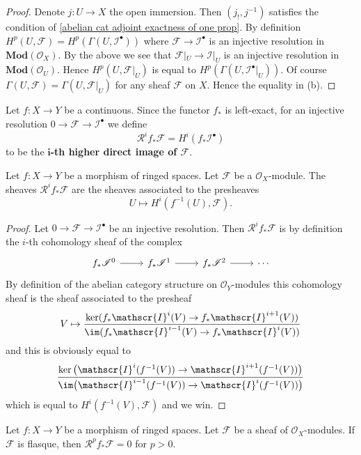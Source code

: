 \begin{proof}
Denote $j:U\to X$ the open immersion. Then $(j_!,j^{-1})$ satisfies the condition of \cref{abelian cat adjoint exactness of one prop}. By definition $H^p(U,\mathscr{F})=H^p(\Gamma(U,\mathscr{I}^\bullet))$ where $\mathscr{F}\to\mathscr{I}^\bullet$ is an injective resolution in $\mathbf{Mod}(\mathscr{O}_X)$. By the above we see that $\mathscr{F}|_U\to\mathscr{I}|_U$ is an injective resolution in $\mathbf{Mod}(\mathscr{O}_U)$. Hence $H^p(U,\mathscr{F}|_U)$ is equal to $H^p(\Gamma(U,\mathscr{I}^\bullet|_U))$. Of course $\Gamma(U,\mathscr{F})=\Gamma(U,\mathscr{F}|_U)$ for any sheaf $\mathscr{F}$ on $X$. Hence the equality in (b).
\end{proof}
Let $f:X\to Y$ be a continuous. Since the functor $f_*$ is left-exact, for an injective resolution $0\to\mathscr{F}\to\mathscr{I}^\bullet$ we define 
\[\mathcal{R}^if_*\mathscr{F}=H^i(f_*\mathscr{I}^\bullet)\]
to be the \textbf{$\bm{i}$-th higher direct image of $\mathscr{F}$}.
\begin{proposition}\label{push derive char}
Let $f:X\to Y$ be a morphism of ringed spaces. Let $\mathscr{F}$ be a $\mathscr{O}_X$-module. The sheaves $\mathcal{R}^if_*\mathscr{F}$ are the sheaves associated to the presheaves
\[U\mapsto H^i(f^{-1}(U),\mathscr{F}).\]
\end{proposition}
\begin{proof}
Let $0\to\mathscr{F}\to\mathscr{I}^\bullet$ be an injective resolution. Then $\mathcal{R}^if_*\mathscr{F}$ is by definition the $i$-th cohomology sheaf of the complex
\[\begin{tikzcd}
f_*\mathscr{I}^0\ar[r]&f_*\mathscr{I}^1\ar[r]&f_*\mathscr{I}^2\ar[r]&\cdots
\end{tikzcd}\]
By definition of the abelian category structure on $\mathscr{O}_Y$-modules this cohomology sheaf is the sheaf associated to the presheaf
\[V\mapsto\frac{\ker(f_*\mathscr{I}^i(V)\to f_*\mathscr{I}^{i+1}(V))}{\im (f_*\mathscr{I}^{i-1}(V)\to f_*\mathscr{I}^{i}(V))}\]
and this is obviously equal to
\[\frac{\ker\big(\mathscr{I}^i(f^{-1}(V))\to\mathscr{I}^{i+1}(f^{-1}(V))\big)}{\im\big(\mathscr{I}^{i-1}(f^{-1}(V))\to\mathscr{I}^{i}(f^{-1}(V))\big)}\]
which is equal to $H^i(f^{-1}(V),\mathscr{F})$ and we win.
\end{proof}
\begin{corollary}
Let $f:X\to Y$ be a morphism of ringed spaces. Let $\mathscr{F}$ be a sheaf of $\mathscr{O}_X$-modules. If $\mathscr{F}$ is flasque, then $\mathcal{R}^pf_*\mathscr{F}=0$ for $p>0$.
\end{corollary}
